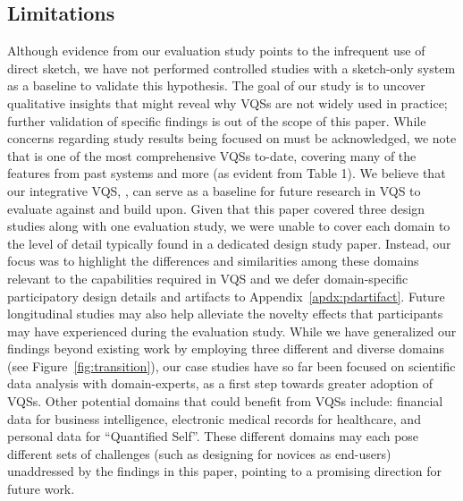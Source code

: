  \subsection{Limitations}%
 \par Although evidence from our evaluation study points to the infrequent use of direct sketch, we have not performed controlled studies with a sketch-only system as a baseline to validate this hypothesis. The goal of our study is to uncover qualitative insights that might reveal why VQSs are not widely used in practice; further validation of specific findings is out of the scope of this paper. While concerns regarding study results being focused on \zvpp must be acknowledged, we note that \zvpp is one of the most comprehensive VQSs to-date, covering many of the features from past systems and more (as evident from Table 1). We believe that our integrative VQS, \zvpp, can serve as a baseline for future research in VQS to evaluate against and build upon. Given that this paper covered three design studies along with one evaluation study, we were unable to cover each domain to the level of detail typically found in a dedicated design study paper. Instead, our focus was to highlight the differences and similarities among these domains relevant to the capabilities required in VQS and we defer domain-specific participatory design details and artifacts to Appendix~\ref{apdx:pdartifact}. Future longitudinal studies may also help alleviate the novelty effects that participants may have experienced during the evaluation study. While we have generalized our findings beyond existing work by employing three different and diverse domains (see Figure~\ref{fig:transition}),
 our case studies have so far
 been focused on scientific data analysis with domain-experts,
 as a first step towards greater adoption of VQSs.
 Other potential domains that could benefit from VQSs include:
 financial data for business intelligence,
 electronic medical records for healthcare,
 and personal data for ``Quantified Self''.
 These different domains may each pose different sets of challenges (such as designing for novices as end-users) unaddressed by the findings in this paper,
  pointing to a promising direction for future work.